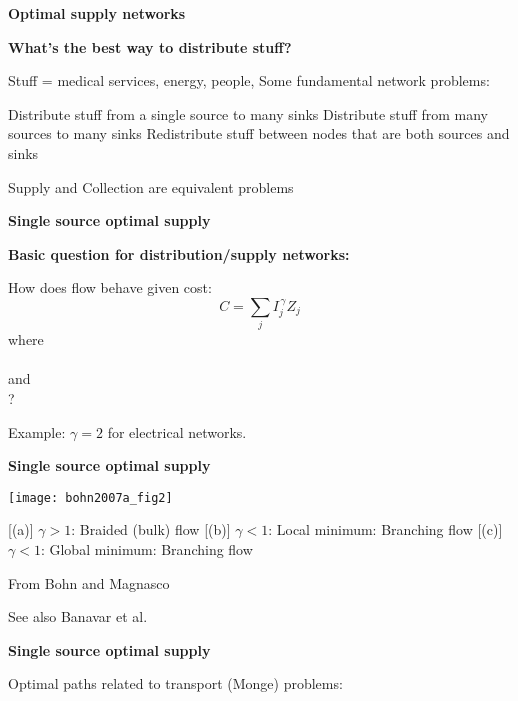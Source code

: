
  \textbf{Optimal supply networks}

  \textbf{What's the best way to distribute stuff?}
    
     Stuff = medical services, energy, people, 
     \alert{Some} fundamental network problems:
      
       Distribute stuff from a \alert{single source} to
        \alert{many sinks}
       Distribute stuff from \alert{many sources} to
        many sinks
       \alert{Redistribute} stuff between nodes that
        are both sources and sinks
      
     Supply and Collection are equivalent problems
    
  
  


  \textbf{Single source optimal supply}

  \textbf{Basic question for distribution/supply networks:}
    
    
      How does flow behave given cost:
      $$
      C 
      = 
      \sum_{j} I_j^{\, \gamma} Z_j
      $$
      where \\
      \\
      and\\
      ?
    
      Example: $\gamma=2$ for electrical networks.
    
  
  


  \textbf{Single source optimal supply}

  \texttt{[image: bohn2007a\_fig2]}
  
  
  [(a)]
    $\gamma > 1$: \alert{Braided} (bulk) flow 
  [(b)]
    $\gamma < 1$:
    Local minimum: \alert{Branching} flow
  [(c)] 
    $\gamma < 1$:
    Global minimum: \alert{Branching} flow
    
  

  \medskip
  
  {\small From Bohn and Magnasco\cite{bohn2007a}}

  {\small See also Banavar et al.\cite{banavar2000a}}


  \textbf{Single source optimal supply}

  Optimal paths related to transport (Monge) problems:

